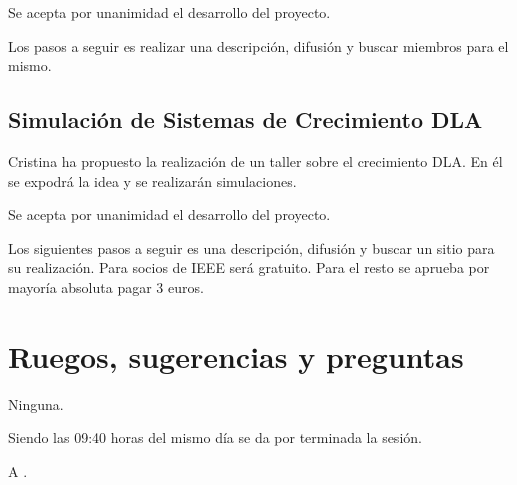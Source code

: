 \documentclass[12pt,twoside,openany,a4paper]{book}
\begin{document}
    Se acepta por unanimidad el desarrollo del proyecto.

    Los pasos a seguir es realizar una descripción, difusión y buscar miembros para el mismo.

    \subsection{Simulación de Sistemas de Crecimiento DLA}
    Cristina ha propuesto la realización de un taller sobre el crecimiento DLA. En él se expodrá la idea y se realizarán simulaciones.

    Se acepta por unanimidad el desarrollo del proyecto.

    Los siguientes pasos a seguir es una descripción, difusión y buscar un sitio para su realización. Para socios de IEEE será gratuito. Para el resto se aprueba por mayoría absoluta pagar 3 euros.

    \section{Ruegos, sugerencias y preguntas}
    Ninguna.


    \clearpage
    Siendo las 09:40 horas del mismo día se da por terminada la sesión.

    A \Date.
    \vspace{10mm}
\end{document}
